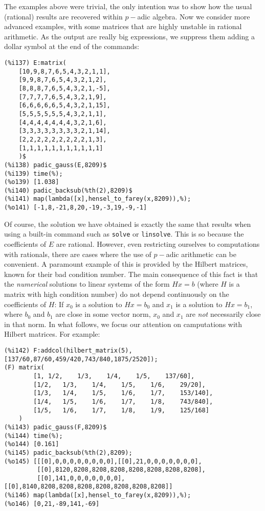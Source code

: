 \documentclass[fleqn]{cas-sc}
\begin{document}
The examples above were trivial, the only intention was to show
	how the usual (rational) results are recovered within $p-$adic algebra.
	Now we consider more advanced examples, with some matrices that
	are highly unstable in rational arithmetic. As the output are really
	big expressions, we suppress them adding a dollar symbol at the end of the commands:
	
\begin{verbatim}
(%i137)	E:matrix(
	[10,9,8,7,6,5,4,3,2,1,1],
	[9,9,8,7,6,5,4,3,2,1,2],
	[8,8,8,7,6,5,4,3,2,1,-5],
	[7,7,7,7,6,5,4,3,2,1,9],
	[6,6,6,6,6,5,4,3,2,1,15],
	[5,5,5,5,5,5,4,3,2,1,1],
	[4,4,4,4,4,4,4,3,2,1,6],
	[3,3,3,3,3,3,3,3,2,1,14],
	[2,2,2,2,2,2,2,2,2,1,3],
	[1,1,1,1,1,1,1,1,1,1,1]
	)$
(%i138)	padic_gauss(E,8209)$
(%i139)	time(%);
(%o139)	[1.038]
(%i140)	padic_backsub(%th(2),8209)$
(%i141)	map(lambda([x],hensel_to_farey(x,8209)),%);
(%o141)	[-1,8,-21,8,20,-19,-3,19,-9,-1]
\end{verbatim}
Of course, the solution we have obtained is exactly the same that results
when using a built-in command such as \texttt{solve} or \texttt{linsolve}.
This is so because the coefficients of $E$ are rational. However, even 
restricting ourselves to computations with rationals, there are cases where
the use of $p-$adic arithmetic can be convenient. A paramount example of this
is provided by the Hilbert matrices, known for their bad condition number.
The main consequence of this fact is that the \emph{numerical} solutions to
linear systems of the form $Hx=b$ (where $H$ is a matrix with high condition
number) do not depend continuously on the coefficients of $H$: If $x_0$ is
a solution to $Hx=b_0$ and $x_1$ is a solution to $Hx=b_1$, where $b_0$ and $b_1$
are close in some vector norm, $x_0$ and $x_1$ are \emph{not} necessarily close in
that norm.
In what follows, we focus our attention on camputations with Hilbert matrices.
For example:
\begin{verbatim}
(%i142)	F:addcol(hilbert_matrix(5),[137/60,87/60,459/420,743/840,1875/2520]);
(F)	matrix(
		[1,	1/2,	1/3,	1/4,	1/5,	137/60],
		[1/2,	1/3,	1/4,	1/5,	1/6,	29/20],
		[1/3,	1/4,	1/5,	1/6,	1/7,	153/140],
		[1/4,	1/5,	1/6,	1/7,	1/8,	743/840],
		[1/5,	1/6,	1/7,	1/8,	1/9,	125/168]
	)
(%i143)	padic_gauss(F,8209)$
(%i144)	time(%);
(%o144)	[0.161]
(%i145)	padic_backsub(%th(2),8209);
(%o145)	[[[0],0,0,0,0,0,0,0,0],[[0],21,0,0,0,0,0,0,0],
         [[0],8120,8208,8208,8208,8208,8208,8208,8208],
         [[0],141,0,0,0,0,0,0,0],[[0],8140,8208,8208,8208,8208,8208,8208,8208]]
(%i146)	map(lambda([x],hensel_to_farey(x,8209)),%);
(%o146)	[0,21,-89,141,-69]
\end{verbatim}
\end{document}
